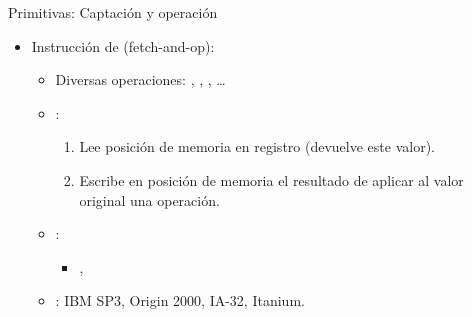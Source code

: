 \begin{frame}[t]{Primitivas: Captación y operación}
\begin{itemize}
  \item Instrucción de  (fetch-and-op):
    \begin{itemize}
      \item Diversas operaciones: , , , \ldots

      \item {}:
        \begin{enumerate}

          \item Lee posición de memoria en registro (devuelve este valor).

          \item Escribe en posición de memoria el resultado de aplicar al valor original una operación.
        \end{enumerate}

      \item {}:
        \begin{itemize}
          \item {} , 
        \end{itemize}

      \item {}: IBM SP3, Origin 2000, IA-32, Itanium.
    \end{itemize}
\end{itemize}
\end{frame}

